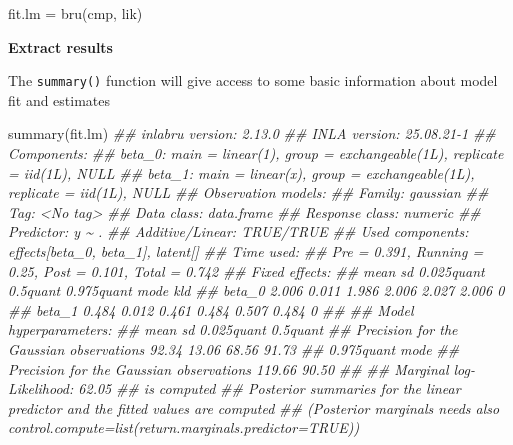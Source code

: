 \documentclass[
  letterpaper,
  DIV=11,
  numbers=noendperiod]{scrartcl}
\newenvironment{Shaded}{\begin{snugshade}}{\end{snugshade}}
\newcommand{\DocumentationTok}[1]{\textcolor[rgb]{0.37,0.37,0.37}{\textit{#1}}}
\newcommand{\FunctionTok}[1]{\textcolor[rgb]{0.28,0.35,0.67}{#1}}
\newcommand{\NormalTok}[1]{\textcolor[rgb]{0.00,0.23,0.31}{#1}}
\newcommand{\OtherTok}[1]{\textcolor[rgb]{0.00,0.23,0.31}{#1}}
\begin{document}
\begin{Shaded}
\begin{Highlighting}[]
\NormalTok{fit.lm }\OtherTok{=} \FunctionTok{bru}\NormalTok{(cmp, lik)}
\end{Highlighting}
\end{Shaded}

\textbf{Extract results}

The \texttt{summary()} function will give access to some basic
information about model fit and estimates

\begin{Shaded}
\begin{Highlighting}[]
\FunctionTok{summary}\NormalTok{(fit.lm)}
\DocumentationTok{\#\# inlabru version: 2.13.0}
\DocumentationTok{\#\# INLA version: 25.08.21{-}1}
\DocumentationTok{\#\# Components:}
\DocumentationTok{\#\# beta\_0: main = linear(1), group = exchangeable(1L), replicate = iid(1L), NULL}
\DocumentationTok{\#\# beta\_1: main = linear(x), group = exchangeable(1L), replicate = iid(1L), NULL}
\DocumentationTok{\#\# Observation models:}
\DocumentationTok{\#\#   Family: \textquotesingle{}gaussian\textquotesingle{}}
\DocumentationTok{\#\#     Tag: \textless{}No tag\textgreater{}}
\DocumentationTok{\#\#     Data class: \textquotesingle{}data.frame\textquotesingle{}}
\DocumentationTok{\#\#     Response class: \textquotesingle{}numeric\textquotesingle{}}
\DocumentationTok{\#\#     Predictor: y \textasciitilde{} .}
\DocumentationTok{\#\#     Additive/Linear: TRUE/TRUE}
\DocumentationTok{\#\#     Used components: effects[beta\_0, beta\_1], latent[]}
\DocumentationTok{\#\# Time used:}
\DocumentationTok{\#\#     Pre = 0.391, Running = 0.25, Post = 0.101, Total = 0.742 }
\DocumentationTok{\#\# Fixed effects:}
\DocumentationTok{\#\#         mean    sd 0.025quant 0.5quant 0.975quant  mode kld}
\DocumentationTok{\#\# beta\_0 2.006 0.011      1.986    2.006      2.027 2.006   0}
\DocumentationTok{\#\# beta\_1 0.484 0.012      0.461    0.484      0.507 0.484   0}
\DocumentationTok{\#\# }
\DocumentationTok{\#\# Model hyperparameters:}
\DocumentationTok{\#\#                                          mean    sd 0.025quant 0.5quant}
\DocumentationTok{\#\# Precision for the Gaussian observations 92.34 13.06      68.56    91.73}
\DocumentationTok{\#\#                                         0.975quant  mode}
\DocumentationTok{\#\# Precision for the Gaussian observations     119.66 90.50}
\DocumentationTok{\#\# }
\DocumentationTok{\#\# Marginal log{-}Likelihood:  62.05 }
\DocumentationTok{\#\#  is computed }
\DocumentationTok{\#\# Posterior summaries for the linear predictor and the fitted values are computed}
\DocumentationTok{\#\# (Posterior marginals needs also \textquotesingle{}control.compute=list(return.marginals.predictor=TRUE)\textquotesingle{})}
\end{Highlighting}
\end{Shaded}
\end{document}
